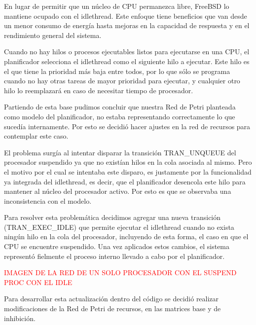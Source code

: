 En lugar de permitir que un núcleo de CPU permanezca libre, FreeBSD lo mantiene ocupado con el idlethread. Este enfoque tiene beneficios que van desde un menor consumo de energía hasta mejoras en la capacidad de respuesta y en el rendimiento general del sistema.\par

Cuando no hay hilos o procesos ejecutables listos para ejecutarse en una CPU, el planificador selecciona el idlethread como el siguiente hilo a ejecutar. Este hilo es el que  tiene la prioridad más baja entre todos, por lo que sólo se programa cuando no hay otras tareas de mayor prioridad para ejecutar, y cualquier otro hilo lo reemplazará en caso de necesitar tiempo de procesador.\par

Partiendo de esta base pudimos concluir que nuestra Red de Petri planteada como modelo del planificador, no estaba representando correctamente lo que sucedía internamente. Por esto se decidió hacer ajustes en la red de recursos para contemplar este caso.\par

El problema surgía al intentar disparar la transición TRAN\_UNQUEUE del procesador suspendido ya que no existían hilos en la cola asociada al mismo. Pero el motivo por el cual se intentaba este disparo, es justamente por la funcionalidad ya integrada del idlethread, es decir, que el planificador desencola este hilo para mantener al núcleo del procesador activo. Por esto es que se observaba una inconsistencia con el modelo.\par

Para resolver esta problemática decidimos agregar una nueva transición (TRAN\_EXEC\_IDLE) que permite ejecutar el idlethread cuando no exista ningún hilo en la cola del procesador, incluyendo de esta forma, el caso en que el CPU se encuentre suspendido. Una vez aplicados estos cambios, el sistema representó fielmente el proceso interno llevado a cabo por el planificador.\par

\textcolor{red}{IMAGEN DE LA RED DE UN SOLO PROCESADOR CON EL SUSPEND PROC CON EL IDLE}

Para desarrollar esta actualización dentro del código se decidió realizar modificaciones de la Red de Petri de recursos, en las matrices base y de inhibición.\par


